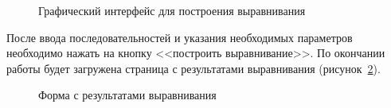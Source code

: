\begin{figure}[h]
	\caption{Графический интерфейс для построения выравнивания}
	\label{ris:webka}
\end{figure}

После ввода последовательностей и указания необходимых параметров необходимо нажать на кнопку <<построить выравнивание>>. По окончании работы будет загружена страница с результатами выравнивания (рисунок~\ref{ris:webkares}).

\begin{figure}[h]
	\caption{Форма с результатами выравнивания}
	\label{ris:webkares}
\end{figure}